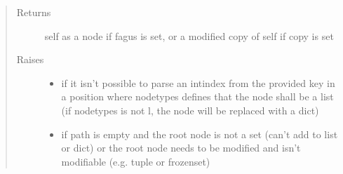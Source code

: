 \documentclass[a4paper,10pt,english]{sphinxmanual}
\begin{document}
\begin{fulllineitems}
\begin{fulllineitems}
\begin{quote}
\begin{description}
\begin{itemize}
\end{itemize}

\item[{Returns}] \leavevmode
\sphinxAtStartPar
self as a node if fagus is set, or a modified copy of self if copy is set

\item[{Raises}] \leavevmode\begin{itemize}
\item {}
\sphinxAtStartPar
{} \textendash{} if it isn’t possible to parse an int\sphinxhyphen{}index from the provided key in a position where node\sphinxhyphen{}types
    defines that the node shall be a list (if node\sphinxhyphen{}types is not l, the node will be replaced with a dict)

\item {}
\sphinxAtStartPar
{} \textendash{} if path is empty and the root node is not a set (can’t add to list or dict) or the root node
    needs to be modified and isn’t modifiable (e.g. tuple or frozenset)

\end{itemize}

\end{description}\end{quote}

\end{fulllineitems}



\end{fulllineitems}
\end{document}
